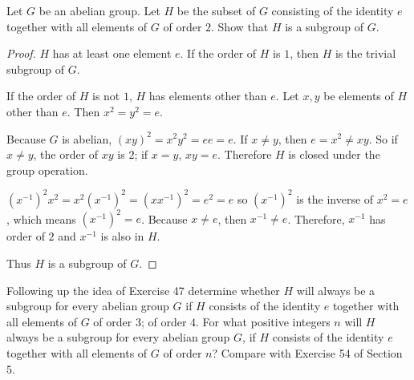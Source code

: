 \begin{exercise}
    Let $G$ be an abelian group. Let $H$ be the subset of $G$ consisting of the identity $e$ together with all elements of $G$ of order $2$. Show that $H$ is a subgroup of $G$.
\end{exercise}

\begin{proof}
    $H$ has at least one element $e$. If the order of $H$ is $1$, then $H$ is the trivial subgroup of $G$.

    If the order of $H$ is not $1$, $H$ has elements other than $e$. Let $x, y$ be elements of $H$ other than $e$. Then $x^{2} = y^{2} = e$.

    Because $G$ is abelian, ${(xy)}^{2} = x^{2}y^{2} = ee = e$. If $x\ne y$, then $e = x^{2} \ne xy$. So if $x\ne y$, the order of $xy$ is $2$; if $x = y$, $xy = e$. Therefore $H$ is closed under the group operation.

    ${(x^{-1})}^{2}x^{2} = x^{2}{(x^{-1})}^{2} = {(xx^{-1})}^{2} = e^{2} = e$ so ${(x^{-1})}^{2}$ is the inverse of $x^{2} = e$, which means ${(x^{-1})}^{2} = e$. Because $x\ne e$, then $x^{-1}\ne e$. Therefore, $x^{-1}$ has order of $2$ and $x^{-1}$ is also in $H$.

    Thus $H$ is a subgroup of $G$.
\end{proof}

\begin{exercise}
    Following up the idea of Exercise 47 determine whether $H$ will always be a subgroup for every abelian group $G$ if $H$ consists of the identity $e$ together with all elements of $G$ of order $3$; of order $4$. For what positive integers $n$ will $H$ always be a subgroup for every abelian group $G$, if $H$ consists of the identity $e$ together with all elements of $G$ of order $n$? Compare with Exercise 54 of Section 5.
\end{exercise}

